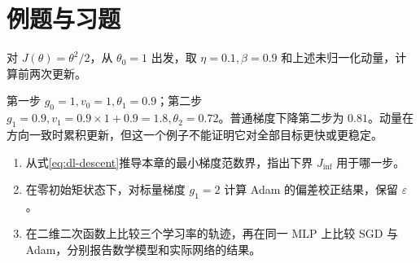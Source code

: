 \section{例题与习题}
\begin{example}[动量累积与步长]
对 $J(\theta)=\theta^2/2$，从 $\theta_0=1$ 出发，取 $\eta=0.1,\beta=0.9$ 和上述未归一化动量，计算前两次更新。
\end{example}
\begin{solve}
第一步 $g_0=1,v_0=1,\theta_1=0.9$；第二步 $g_1=0.9,v_1=0.9\times1+0.9=1.8,\theta_2=0.72$。普通梯度下降第二步为 $0.81$。动量在方向一致时累积更新，但这一个例子不能证明它对全部目标更快或更稳定。
\end{solve}
\begin{enumerate}
\item 从式\eqref{eq:dl-descent}推导本章的最小梯度范数界，指出下界 $J_{\inf}$ 用于哪一步。
\item 在零初始矩状态下，对标量梯度 $g_1=2$ 计算 Adam 的偏差校正结果，保留 $\varepsilon$。
\item 在二维二次函数上比较三个学习率的轨迹，再在同一 MLP 上比较 SGD 与 Adam，分别报告数学模型和实际网络的结果。
\end{enumerate}

